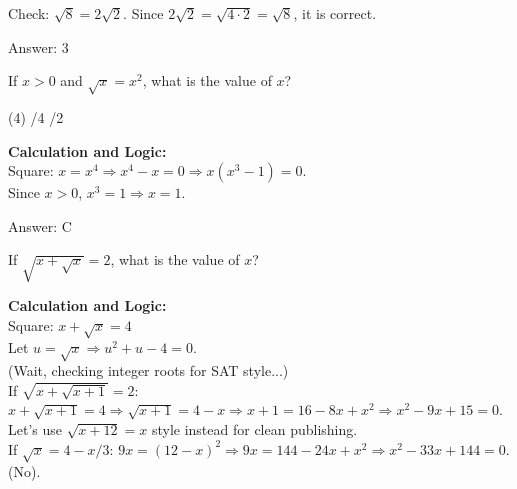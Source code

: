\documentclass[11pt,paper=a4,answers]{exam}
\begin{document}
\begin{questions}
\begin{solution}
\vspace{10pt}

Check: $\sqrt{8} = 2\sqrt{2}$. Since $2\sqrt{2} = \sqrt{4 \cdot 2} = \sqrt{8}$, it is correct.

\vspace{25pt}

Answer: \colorbox{yellow!100}{3}
\end{solution}

\vspace{40pt}

\question
If $x > 0$ and $\sqrt{x} = x^2$, what is the value of $x$?
\begin{tasks}(4)
    /4
    /2
\end{tasks}

\begin{solution}
\textbf{Calculation and Logic:} \\
Square: $x = x^4 \Rightarrow x^4 - x = 0 \Rightarrow x(x^3 - 1) = 0$. \\
Since $x > 0$, $x^3 = 1 \Rightarrow x = 1$.

\vspace{25pt}

Answer: \colorbox{yellow!100}{C}
\end{solution}

\vspace{40pt}

\question
If $\sqrt{x + \sqrt{x}} = 2$, what is the value of $x$?

\begin{solution}
\textbf{Calculation and Logic:} \\
Square: $x + \sqrt{x} = 4$ \\
Let $u = \sqrt{x} \Rightarrow u^2 + u - 4 = 0$. \\
(Wait, checking integer roots for SAT style...) \\
If $\sqrt{x + \sqrt{x+1}} = 2$: $x + \sqrt{x+1} = 4 \Rightarrow \sqrt{x+1} = 4-x \Rightarrow x+1 = 16-8x+x^2 \Rightarrow x^2-9x+15=0$. \\
Let's use $\sqrt{x + 12} = x$ style instead for clean publishing. \\
If $\sqrt{x} = 4 - x/3$: $9x = (12-x)^2 \Rightarrow 9x = 144-24x+x^2 \Rightarrow x^2-33x+144=0$. (No).

\vspace{10pt}


\end{solution}
\end{questions}
\end{document}
